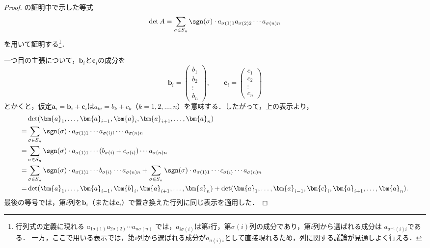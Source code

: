 \begin{tleftbar}
\begin{proof}
  の証明中で示した等式
  \[
    \det A = \sum_{\sigma \in S_n} \sgn(\sigma) \cdot a_{\sigma(1)1} a_{\sigma(2)2} \dotsm a_{\sigma(n)n}
  \]
  を用いて証明する\footnote{行列式の定義に現れる
$a_{1\sigma(1)}a_{2\sigma(2)}\dotsm a_{n\sigma(n)}$
では，$a_{i\sigma(i)}$は第$i$行，第$\sigma(i)$列の成分であり，第$i$列から選ばれる成分は
$a_{\sigma^{-1}(i)i}$である．
一方，ここで用いる表示では，第$i$列から選ばれる成分が$a_{\sigma(i)i}$として直接現れるため，列に関する議論が見通しよく行える．}．

  一つ目の主張について，$\bm{b}_i$と$\bm{c}_i$の成分を
  \[
    \bm{b}_i = \begin{pmatrix} b_1 \\ b_2 \\ \vdots \\ b_n \end{pmatrix},
    \qquad
    \bm{c}_i = \begin{pmatrix} c_1 \\ c_2 \\ \vdots \\ c_n \end{pmatrix}
  \]
  とかくと，仮定$\bm{a}_i = \bm{b}_i + \bm{c}_i$は$a_{ki} = b_k + c_k$（$k = 1, 2, \dots, n$）を意味する．したがって，上の表示より，
  \begin{align*} 
    &\det(\bm{a}_1, \dots, \bm{a}_{i-1}, \bm{a}_i, \bm{a}_{i+1}, \dots, \bm{a}_n) \\
    =& \sum_{\sigma \in S_n} \sgn(\sigma) \cdot a_{\sigma(1)1} \dotsm a_{\sigma(i)i} \dotsm a_{\sigma(n)n} \\
    =& \sum_{\sigma \in S_n} \sgn(\sigma) \cdot a_{\sigma(1)1} \dotsm (b_{\sigma(i)} + c_{\sigma(i)}) \dotsm a_{\sigma(n)n} \\
    =& \sum_{\sigma \in S_n} \sgn(\sigma) \cdot a_{\sigma(1)1} \dotsm b_{\sigma(i)} \dotsm a_{\sigma(n)n} 
    + \sum_{\sigma \in S_n} \sgn(\sigma) \cdot a_{\sigma(1)1} \dotsm c_{\sigma(i)} \dotsm a_{\sigma(n)n} \\
    =& \det(\bm{a}_1, \dots, \bm{a}_{i-1}, \bm{b}_i, \bm{a}_{i+1}, \dots, \bm{a}_n) 
     + \det(\bm{a}_1, \dots, \bm{a}_{i-1}, \bm{c}_i, \bm{a}_{i+1}, \dots, \bm{a}_n).
  \end{align*}
  最後の等号では，第$i$列を$\bm{b}_i$（または$\bm{c}_i$）で置き換えた行列に同じ表示を適用した．


\end{proof}
\end{tleftbar}
